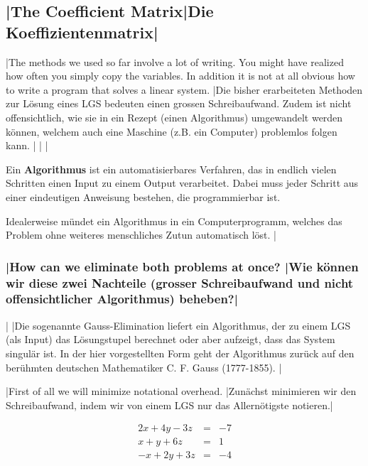 \newpage

\subsection{\tr|The Coefficient Matrix|Die Koeffizientenmatrix|}

\tr|The methods we used so far involve a lot of writing. You might have realized how often you simply copy the variables.
    In addition it is not at all obvious how to write a program that solves a linear system.  
   |Die bisher erarbeiteten Methoden zur Lösung eines LGS bedeuten einen grossen Schreibaufwand.
    Zudem ist nicht offensichtlich, wie sie in ein Rezept (einen Algorithmus) umgewandelt werden können,
    welchem auch eine Maschine (z.B. ein Computer) problemlos folgen kann. |
\tr|
   |
    \begin{tcolorbox}[colback=white]\begin{definition} 
    Ein \textbf{Algorithmus} ist ein automatisierbares Verfahren, das in endlich vielen Schritten einen Input zu einem Output verarbeitet. 
    Dabei muss jeder Schritt aus einer eindeutigen Anweisung bestehen, die programmierbar ist. 
    \end{definition}
    \end{tcolorbox}
    Idealerweise mündet ein Algorithmus in ein Computerprogramm, welches das Problem ohne weiteres menschliches Zutun automatisch löst. 
    \vsp
    |
\subsubsection*{\tr|How can we eliminate both problems at once?
  |Wie können wir diese zwei Nachteile (grosser Schreibaufwand und nicht offensichtlicher Algorithmus) beheben?| }

\tr|
   |Die sogenannte Gauss-Elimination liefert ein Algorithmus, der zu einem LGS (als Input) das Lösungstupel berechnet oder aber aufzeigt, dass das System singulär ist.
   In der hier vorgestellten Form geht der Algorithmus zurück auf den berühmten deutschen Mathematiker C. F. Gauss (1777-1855). |
\vsp

\tr|First of all we will minimize notational overhead. 
   |Zunächst minimieren wir den Schreibaufwand, indem wir von einem LGS nur das Allernötigste notieren.|

\begin{example}
\[
\begin{array}{rcl}
2x+4y-3z&=&-7\\
x+y+6z&=&1\\
-x+2y+3z&=&-4\\
\end{array}
\]
\end{example}
	 
